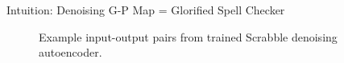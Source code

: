 %
%
%
%
%
%
%
%
%

\begin{frame}{Intuition: Denoising G-P Map = Glorified Spell Checker}

\begin{figure}

\centering \Huge


%
%
%
%


\vspace{1ex}

\caption{
Example input-output pairs from trained Scrabble denoising autoencoder.
}

\end{figure}

\end{frame}
